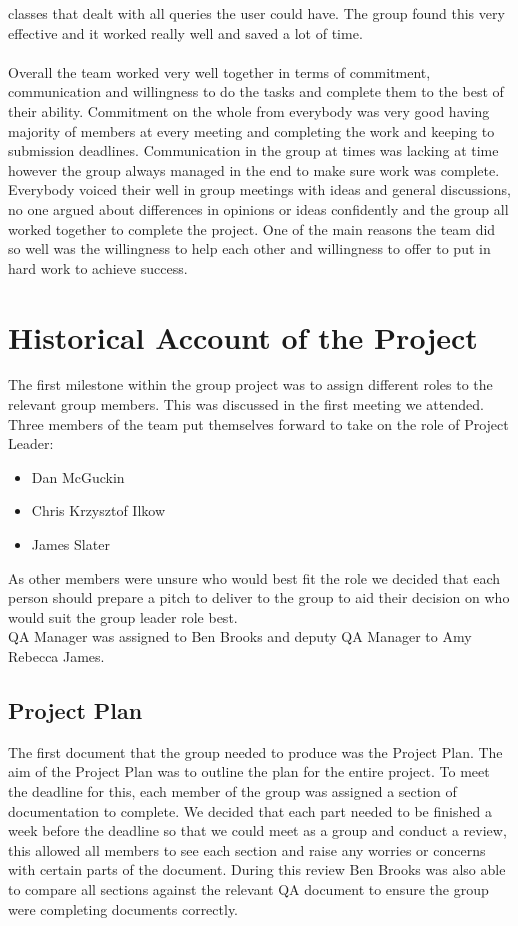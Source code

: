 \documentclass[titlepage]{article}
\begin{document}
{classes that dealt with all queries the user could have. The group found this very effective and it worked really well and saved a lot of
time.
\\
\\
Overall the team worked very well together in terms of commitment, communication and willingness to do the
tasks and complete them to the best of their ability. Commitment on the whole from everybody was very good having majority of
members at every meeting and completing the work and keeping to submission deadlines. Communication in
the group at times was lacking at time however the group always managed in the end to make sure work was complete. Everybody voiced their
well in group meetings with ideas and general discussions, no one argued about differences in
opinions or ideas confidently and the group all worked together to complete the project. One of the main reasons the team
did so well was the willingness to help each other and willingness to offer to put in hard work to achieve success.
\section {Historical Account of the Project}
The first milestone within the group project was to assign different roles to the relevant group members. This was discussed in the first meeting we attended. Three members of the team put themselves forward to take on the role of Project Leader:
\begin{itemize}
\item Dan McGuckin
\item Chris Krzysztof Ilkow
\item James Slater
\end{itemize}
As other members were unsure who would best fit the role we decided that each person should prepare a pitch to deliver to the group to aid their decision on who would suit the group leader role best.\\
QA Manager was assigned to Ben Brooks and deputy QA Manager to Amy Rebecca James.\\
\subsection{Project Plan}
The first document that the group needed to produce was the Project Plan. The aim of the Project Plan was to outline the plan for the entire project. To meet the deadline for this, each member of the group was assigned a section of documentation to complete. We decided that each part needed to be finished a week before the deadline so that we could meet as a group and conduct a review, this allowed all members to see each section and raise any worries or concerns with certain parts of the document. During this review Ben Brooks was also able to compare all sections against the relevant QA document to ensure the group were completing documents correctly.
}
\end{document}
